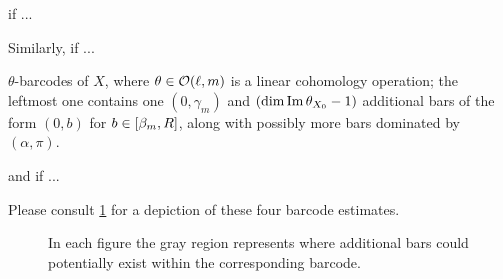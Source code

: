 
if ...

Similarly, if ...

$\theta$-barcodes of $X$, where $\theta\in\mathcal{O}(\ell,m)$ is a linear cohomology operation; the leftmost one contains one \((0, \gamma_m)\) and \((\dim \operatorname{Im} \theta_{X_0} - 1)\) additional bars of the form \((0, b)\) for \(b \in [\beta_m, R]\), along with possibly more bars dominated by \((\alpha, \pi)\).

and if ...

Please consult \cref{fig:barcodes_general} for a depiction of these four barcode estimates.

\begin{figure}
	\centering
	
	\caption{In each figure the gray region represents where additional bars could potentially exist within the corresponding barcode.}
	\label{fig:barcodes_general}
\end{figure}
